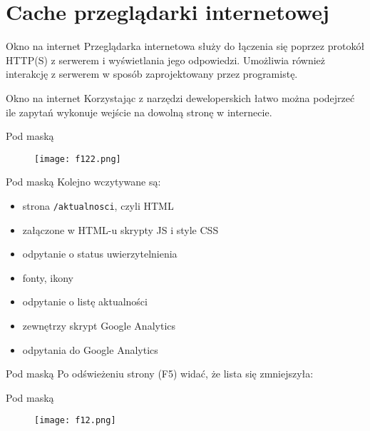 \section{Cache przeglądarki internetowej}

\begin{frame}{Okno na internet}
	Przeglądarka internetowa służy do łączenia się poprzez protokół HTTP(S) z serwerem i wyświetlania jego odpowiedzi. Umożliwia również interakcję z serwerem w sposób zaprojektowany przez programistę.
\end{frame}

\begin{frame}{Okno na internet}
	Korzystając z narzędzi deweloperskich łatwo można podejrzeć ile zapytań wykonuje wejście na dowolną stronę w internecie.
\end{frame}

\begin{frame}{Pod maską}
	\begin{figure}[t]
		\centering
		\texttt{[image: f122.png]}
	\end{figure}
\end{frame}

\begin{frame}{Pod maską}
	Kolejno wczytywane są:
	\begin{itemize}
		\item strona \texttt{/aktualnosci}, czyli HTML
		\item załączone w HTML-u skrypty JS i style CSS
		\item odpytanie o status uwierzytelnienia
		\item fonty, ikony
		\item odpytanie o listę aktualności
		\item zewnętrzy skrypt Google Analytics
		\item odpytania do Google Analytics
	\end{itemize}
\end{frame}

\begin{frame}{Pod maską}
	Po odświeżeniu strony (F5) widać, że lista się zmniejszyła:
\end{frame}

\begin{frame}{Pod maską}
	\begin{figure}[t]
		\centering
		\texttt{[image: f12.png]}
	\end{figure}
\end{frame}

